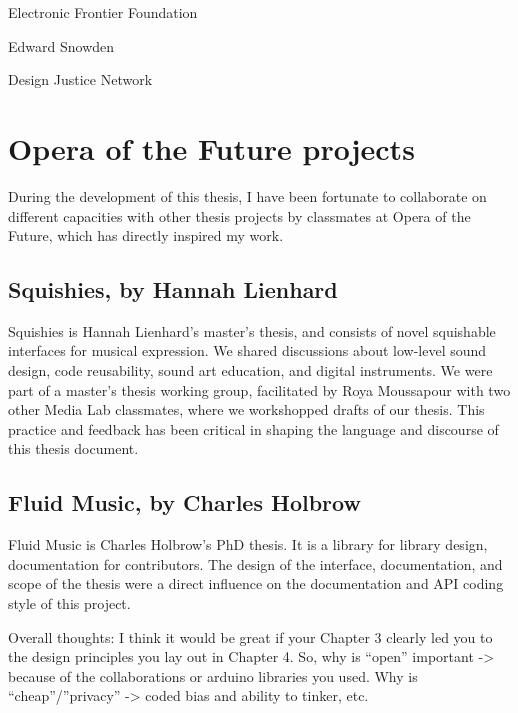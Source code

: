 Electronic Frontier Foundation

Edward Snowden

Design Justice Network

\section{Opera of the Future projects}

During the development of this thesis, I have been fortunate to collaborate on different capacities with other thesis projects by classmates at Opera of the Future, which has directly inspired my work.

\subsection{Squishies, by Hannah Lienhard}

Squishies is Hannah Lienhard's master's thesis, and consists of novel squishable interfaces for musical expression. We shared discussions about low-level sound design, code reusability, sound art education, and digital instruments. We were part of a master's thesis working group, facilitated by Roya Moussapour with two other Media Lab classmates, where we workshopped drafts of our thesis. This practice and feedback has been critical in shaping the language and discourse of this thesis document.

\subsection{Fluid Music, by Charles Holbrow}

Fluid Music is Charles Holbrow's PhD thesis. It is a library for library design, documentation for contributors. The design of the interface, documentation, and scope of the thesis were a direct influence on the documentation and API coding style of this project.

Overall thoughts: I think it would be great if your Chapter 3 clearly led you to the design principles you lay out in Chapter 4. So, why is “open” important -> because of the collaborations or arduino libraries you used. Why is “cheap”/”privacy” -> coded bias and ability to tinker, etc.
